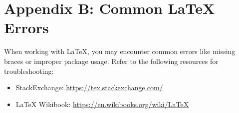 \documentclass[12pt]{book}
\begin{document}

\chapter{Appendix B: Common LaTeX Errors}
When working with LaTeX, you may encounter common errors like missing braces or improper package usage. Refer to the following resources for troubleshooting:

\begin{itemize}
    \item StackExchange: \url{https://tex.stackexchange.com/}
    \item LaTeX Wikibook: \url{https://en.wikibooks.org/wiki/LaTeX}
\end{itemize}


\newpage
\printbibliography
{}


\newpage
{} %
\printindex
\end{document}

